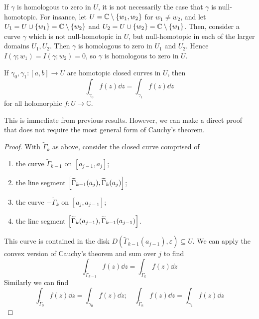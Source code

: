 \begin{remark}
	If \( \gamma \) is homologous to zero in \( U \), it is not necessarily the case that \( \gamma \) is null-homotopic.
	For insance, let \( U = \mathbb C \setminus \qty{w_1,w_2} \) for \( w_1 \neq w_2 \), and let \( U_1 = U \cup \qty{w_1} = \mathbb C \setminus \qty{w_2} \) and \( U_2 = U \cup \qty{w_2} = \mathbb C \setminus \qty{w_1} \).
	Then, consider a curve \( \gamma \) which is not null-homotopic in \( U \), but null-homotopic in each of the larger domains \( U_1, U_2 \).
	Then \( \gamma \) is homologous to zero in \( U_1 \) and \( U_2 \).
	Hence \( I(\gamma;w_1) = I(\gamma;w_2) = 0 \), so \( \gamma \) is homologous to zero in \( U \).
\end{remark}
\begin{corollary}
	If \( \gamma_0, \gamma_1 \colon [a,b] \to U \) are homotopic closed curves in \( U \), then
	\[ \int_{\gamma_0} f(z) \dd{z} = \int_{\gamma_1} f(z) \dd{z} \]
	for all holomorphic \( f \colon U \to \mathbb C \).
\end{corollary}
This is immediate from previous results.
However, we can make a direct proof that does not require the most general form of Cauchy's theorem.
\begin{proof}
	With \( \widetilde \Gamma_k \) as above, consider the closed curve comprised of
	\begin{enumerate}
		\item the curve \( \widetilde \Gamma_{k-1} \) on \( [a_{j-1}, a_j] \);
		\item the line segment \( \qty[\widetilde \Gamma_{k-1}(a_j), \widetilde \Gamma_k(a_j)] \);
		\item the curve \( - \widetilde \Gamma_{k} \) on \( [a_j, a_{j-1}] \);
		\item the line segment \( \qty[\widetilde \Gamma_k(a_{j-1}), \widetilde \Gamma_{k-1}(a_{j-1})] \).
	\end{enumerate}
	This curve is contained in the disk \( D(\widetilde \Gamma_{k-1}(a_{j-1}), \varepsilon) \subseteq U \).
	We can apply the convex version of Cauchy's theorem and sum over \( j \) to find
	\[ \int_{\widetilde \Gamma_{k-1}} f(z) \dd{z} = \int_{\widetilde \Gamma_k} f(z) \dd{z} \]
	Similarly we can find
	\[ \int_{\widetilde \Gamma_0} f(z) \dd{z} = \int_{\gamma_0} f(z) \dd{z};\quad \int_{\widetilde \Gamma_n} f(z) \dd{z} = \int_{\gamma_1} f(z) \dd{z} \]
\end{proof}

